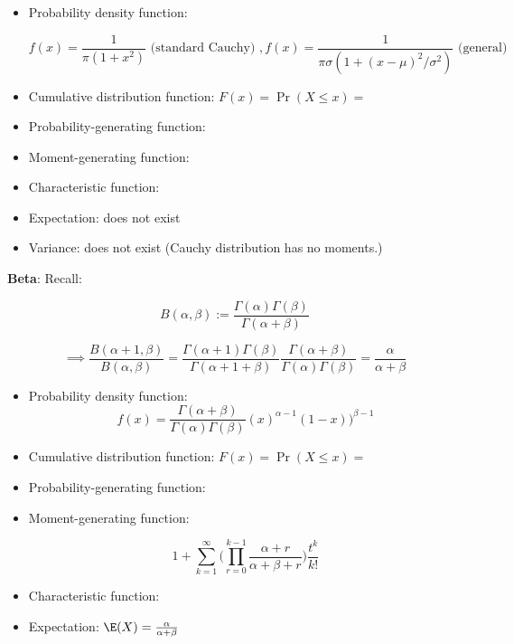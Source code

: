 \begin{itemize}
\begin{itemize}
\item Probability density function: 

\[
f(x) = \frac{1}{\pi(1 + x^2)} \text{ (standard Cauchy) }, f(x) = \frac{1}{\pi \sigma (1 + (x - \mu)^2/\sigma^2)}  \text{ (general)}
\]

\item Cumulative distribution function: \(F(x) = \Pr(X \leq x) = \)

\item Probability-generating function:

\item Moment-generating function:

\item Characteristic function:

\item Expectation: does not exist

\item Variance: does not exist (Cauchy distribution has no moments.)

\end{itemize}

\textbf{Beta}: Recall:

\[
B(\alpha, \beta) := \frac{\Gamma(\alpha) \Gamma(\beta)}{\Gamma(\alpha + \beta)}
\]

\[
\implies \frac{B(\alpha + 1, \beta)}{B(\alpha, \beta)} = \frac{\Gamma(\alpha + 1) \Gamma(\beta)}{\Gamma(\alpha + 1 + \beta)} \frac{\Gamma(\alpha + \beta)}{\Gamma(\alpha)\Gamma(\beta)} = \frac{\alpha}{\alpha + \beta}
\]

\begin{itemize}

\item Probability density function: 
\[
f(x)= \frac{\Gamma(\alpha + \beta)}{\Gamma(\alpha) \Gamma(\beta)} (x)^{\alpha-1}(1-x))^{\beta - 1}
\]

\item Cumulative distribution function: \(F(x) = \Pr(X \leq x) = \)

\item Probability-generating function:

\item Moment-generating function:

\[
1 + \sum_{k=1}^\infty \Bigg(  \prod_{r=0}^{k-1} \frac{\alpha +r}{\alpha + \beta + r}\Bigg) \frac{t^k}{k!}
\]

\item Characteristic function:

\item Expectation: \(\E(X) = \frac{\alpha}{\alpha + \beta} \)


\end{itemize}
\end{itemize}
